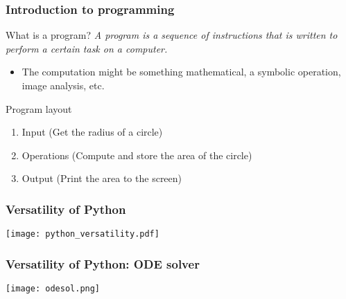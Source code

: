                   \begin{frame}
                \frametitle{Introduction to programming}
                \begin{block}{What is a program?}
                  \emph{A program is a sequence of instructions that is written to perform a certain task on a computer.} %
                \end{block}
                \begin{itemize}
                  \item The computation might be something mathematical, a symbolic operation, image analysis, etc.%
                \end{itemize}
                \begin{block}{Program layout}
  \begin{enumerate}
    \item Input (Get the radius of a circle)
    \item Operations (Compute and store the area of the circle)
    \item Output (Print the area to the screen)
  \end{enumerate}
\end{block}
\end{frame}

\begin{frame}
  \frametitle{Versatility of Python}
  \centering\texttt{[image: python\_versatility.pdf]}
\end{frame}

\begin{frame}
  \frametitle{Versatility of Python: ODE solver}
  \texttt{[image: odesol.png]}
\end{frame}

